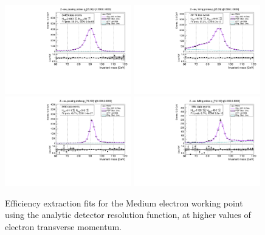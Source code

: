 {\begin{figure}
\centering
\includegraphics[width=0.49\textwidth]{figures/Zee_ResFunc_BkgLPiEMu_pass_ptBin3_etaBin23.pdf}
\includegraphics[width=0.49\textwidth]{figures/Zee_ResFunc_BkgLPiEMu_fail_ptBin3_etaBin23.pdf}
\includegraphics[width=0.49\textwidth]{figures/Zee_ResFunc_BkgLPiEMu_pass_ptBin14_etaBin17.pdf}
\includegraphics[width=0.49\textwidth]{figures/Zee_ResFunc_BkgLPiEMu_fail_ptBin14_etaBin17.pdf}
\caption{Efficiency extraction fits for the Medium electron working point using the analytic detector resolution function, at higher values of electron transverse momentum.}
\label{fig:ZeeAltSigResFits2}
\end{figure}


}
